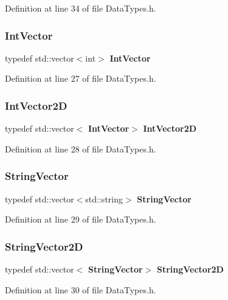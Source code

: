 Definition at line 34 of file Data\+Types.\+h.

\mbox{\label{_data_types_8h_a9b8f2f96749808efd0d975e75d96a71c}} 
\subsubsection{Int\+Vector}
{\footnotesize\ttfamily typedef std\+::vector$<$int$>$ \textbf{ Int\+Vector}}



Definition at line 27 of file Data\+Types.\+h.

\mbox{\label{_data_types_8h_a2611314ab2c7ffc99f4b34f959b4723c}} 
\subsubsection{Int\+Vector2D}
{\footnotesize\ttfamily typedef std\+::vector$<$\textbf{ Int\+Vector}$>$ \textbf{ Int\+Vector2D}}



Definition at line 28 of file Data\+Types.\+h.

\mbox{\label{_data_types_8h_ab8e1ede88e2ff1c3b448334e6cbd3533}} 
\subsubsection{String\+Vector}
{\footnotesize\ttfamily typedef std\+::vector$<$std\+::string$>$ \textbf{ String\+Vector}}



Definition at line 29 of file Data\+Types.\+h.

\mbox{\label{_data_types_8h_acccc44108a5c4da23723c861fdaf8ed5}} 
\subsubsection{String\+Vector2D}
{\footnotesize\ttfamily typedef std\+::vector$<$\textbf{ String\+Vector}$>$ \textbf{ String\+Vector2D}}



Definition at line 30 of file Data\+Types.\+h.


